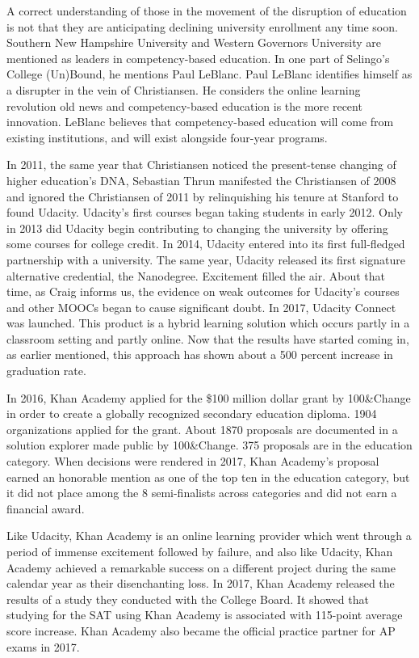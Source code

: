\documentclass[AER]{/Users/zyl357/Documents/GitHub/research-dissertation-case-for-alt-ed/papers/alt-ed-survey/aea-latex-templates/AEA}
\begin{document}
A correct understanding of those in the movement of the disruption of
education is not that they are anticipating declining university
enrollment any time soon. Southern New Hampshire University and Western
Governors University are mentioned as leaders in competency-based
education. In one part of Selingo's College (Un)Bound, he mentions Paul
LeBlanc. Paul LeBlanc identifies himself as a disrupter in the vein of
Christiansen. He considers the online learning revolution old news and
competency-based education is the more recent innovation. LeBlanc believes
that competency-based education will come from existing institutions, and
will exist alongside four-year programs.

In 2011, the same year that Christiansen noticed the present-tense
changing of higher education’s DNA, Sebastian Thrun manifested the
Christiansen of 2008 and ignored the Christiansen of 2011 by relinquishing
his tenure at Stanford to found Udacity. Udacity's first courses began
taking students in early 2012\cite{desantis2012stanford}. Only in 2013 did Udacity begin contributing
to changing the university by offering some courses for college credit. In
2014, Udacity entered into its first full-fledged partnership with a
university. The same year, Udacity released its first signature
alternative credential, the Nanodegree. Excitement filled the air. About
that time, as Craig informs us, the evidence on weak outcomes for
Udacity's courses and other MOOCs began to cause significant doubt. In
2017, Udacity Connect was launched. This product is a hybrid learning
solution which occurs partly in a classroom setting and partly online. Now
that the results have started coming in, as earlier mentioned, this
approach has shown about a 500 percent increase in graduation rate.

In 2016, Khan Academy applied for the \$100 million dollar grant by
100\&Change in order to create a globally recognized secondary
education diploma. 1904 organizations applied for the grant\cite{daver_2016}. About 1870
proposals are documented in a solution explorer made public by
100\&Change\cite{100change_2017}. 375 proposals are in the education category. When
decisions were rendered in 2017, Khan Academy's proposal earned an
honorable mention as one of the top ten in the education category, but it
did not place among the 8 semi-finalists across categories and did not
earn a financial award\cite{playworks_2017}.

Like Udacity, Khan Academy is an online learning provider which went
through a period of immense excitement followed by failure, and also like
Udacity, Khan Academy achieved a remarkable success on a different project
during the same calendar year as their disenchanting loss. In 2017, Khan
Academy released the results of a study they conducted with the College
Board. It showed that studying for the SAT using Khan Academy is
associated with 115-point average score increase\cite{khanacademy_2017studying20hours}. Khan Academy also became
the official practice partner for AP exams in 2017\cite{khanacademy_2017}.
\end{document}
